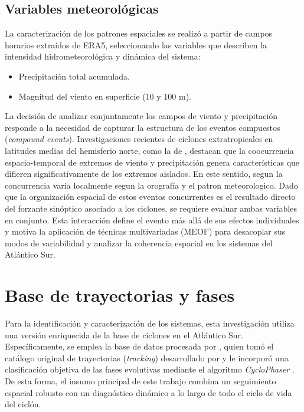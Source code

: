 \subsection{Variables meteorológicas}\label{subsec:variables}
La caracterización de los patrones espaciales se realizó a partir de campos horarios extraídos de ERA5, seleccionando las variables que describen la intensidad hidrometeorológica y dinámica del sistema:
\begin{itemize}
    \item Precipitación total acumulada.
    \item Magnitud del viento en superficie (10 y 100 m).
\end{itemize}
%
La decisión de analizar conjuntamente los campos de viento y precipitación responde a la necesidad de capturar la estructura de los eventos compuestos (\textit{compound events}). Investigaciones recientes de ciclones extratropicales en latitudes medias del hemisferio norte, como la de \citet{chen2025characteristics}, destacan que la coocurrencia espacio-temporal de extremos de viento y precipitación genera características que difieren significativamente de los extremos aislados. En este sentido, segun  \citet{zscheischler2018future} la concurrencia varía localmente segun la orografía y el patron meteorologico. Dado que la organización espacial de estos eventos concurrentes es el resultado directo del forzante sinóptico asociado a los ciclones, se requiere evaluar ambas variables en conjunto. Esta interacción define el evento más allá de sus efectos individuales y motiva la aplicación de técnicas multivariadas (MEOF) para desacoplar sus modos de variabilidad y analizar la coherencia espacial en los sistemas del Atlántico Sur.

\section{Base de trayectorias y fases}\label{sec:bd_ciclones}

Para la identificación y caracterización de los sistemas, esta investigación utiliza una versión enriquecida de la base de ciclones en el Atlántico Sur. Específicamente, se emplea la base de datos procesada por \citet{coutodesouza2024new}, quien tomó el catálogo original de trayectorias (\textit{tracking}) desarrollado por \citet{gramcianinov2019properties} y le incorporó una clasificación objetiva de las fases evolutivas mediante el algoritmo \textit{CycloPhaser} \citep{deSouza2025CycloPhaser}. De esta forma, el insumo principal de este trabajo combina un seguimiento espacial robusto con un diagnóstico dinámico a lo largo de todo el ciclo de vida del ciclón.

